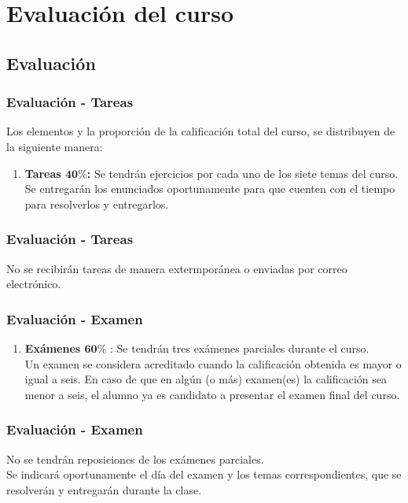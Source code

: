 \documentclass[12pt]{beamer}
\begin{document}
\section{Evaluación del curso}
\subsection{Evaluación}

\begin{frame}
\frametitle{Evaluación - Tareas}
Los elementos y la proporción de la calificación total del curso, se distribuyen de la siguiente manera:
\begin{enumerate}[<+->]
\item \textbf{Tareas $\mathbf{40\%}$:} Se tendrán ejercicios por cada uno de los siete temas del curso. Se entregarán los enunciados oportunamente para que cuenten con el tiempo para resolverlos y entregarlos.
\seti
\end{enumerate}
\end{frame}
\begin{frame}
\frametitle{Evaluación - Tareas}
No se recibirán tareas de manera extermporánea o enviadas por correo electrónico.
\end{frame}
\begin{frame}
\frametitle{Evaluación - Examen}
\begin{enumerate}[<+->]    
\conti
\item \textbf{Exámenes $\mathbf{60\%}$} : Se tendrán tres exámenes parciales durante el curso.
\\
\bigskip
Un examen se considera acreditado cuando la calificación obtenida es mayor o igual a seis. En caso de que en algún (o más) examen(es) la calificación sea menor a seis, el alumno ya es candidato a presentar el examen final del curso.
\end{enumerate}
\end{frame}
\begin{frame}
\frametitle{Evaluación - Examen}
No se tendrán reposiciones de los exámenes parciales.
\\
\bigskip
Se indicará oportunamente el día del examen y los temas correspondientes, que se resolverán y entregarán durante la clase.
\end{frame}
\end{document}
